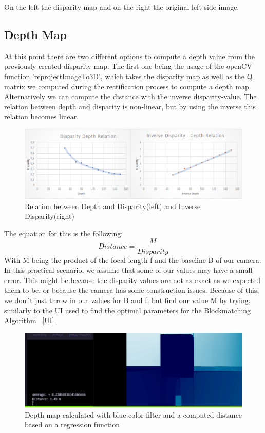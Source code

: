 \documentclass[journal,onecolumn]{IEEEtran}
\begin{document}
\noindent On the left the disparity map and on the right the original left side image.

\subsection{Depth Map}
\noindent
\noindent At this point there are two different options to compute a depth value from the previously created disparity map. The first one being the usage of the openCV function 'reprojectImageTo3D', which takes the disparity map as well as the Q matrix we computed during the rectification process to compute a depth map.
Alternatively we can compute the distance with the inverse disparity-value. The relation between depth and disparity is non-linear, but by using the inverse this relation becomes linear. 
\begin{figure}[H]
	\centering
	\includegraphics[scale=0.5]{ratios.png}
	\captionsetup{justification=centering}
	\caption{Relation between Depth and Disparity(left) and Inverse Disparity(right)}
\end{figure}
\noindent The equation for this is the following: 
\begin{equation}
	Distance = \frac{M}{Disparity}
\end{equation}
\noindent With M being the product of the focal length f and the baseline B of our camera. \newline
In this practical scenario, we assume that some of our values may have a small error. This might be because the disparity values are not as exact as we expected them to be, or because the camera has some construction issues. Because of this, we don´t just throw in our values for B and f, but find our value M by trying, similarly to the UI used to find the optimal parameters for the Blockmatching Algorithm ~\ref{UI}. 

\begin{figure}[H]
	\centering
	\includegraphics[scale=0.5]{distanceCalcRegression.png}
	\captionsetup{justification=centering}
	\caption{Depth map calculated with blue color filter and a computed distance based on a regression function}
\end{figure}
\end{document}
